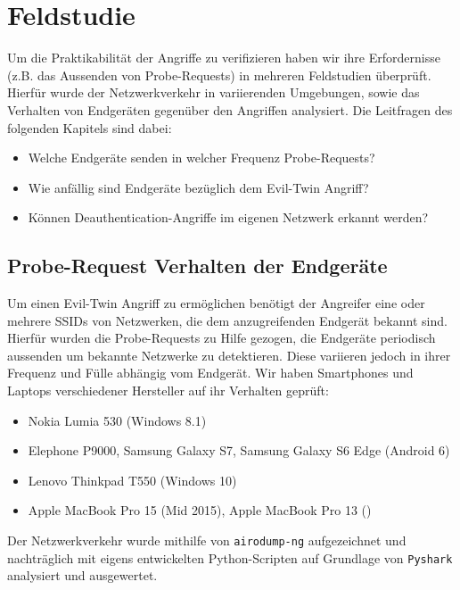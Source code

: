 \section{Feldstudie}
Um die Praktikabilität der Angriffe zu verifizieren haben wir ihre Erfordernisse (z.B. das Aussenden von Probe-Requests) in mehreren Feldstudien überprüft.
Hierfür wurde der Netzwerkverkehr in variierenden Umgebungen, sowie das Verhalten von Endgeräten gegenüber den Angriffen analysiert.
Die Leitfragen des folgenden Kapitels sind dabei:
\begin{itemize}
	\item Welche Endgeräte senden in welcher Frequenz Probe-Requests?
	\item Wie anfällig sind Endgeräte bezüglich dem Evil-Twin Angriff?
	\item Können Deauthentication-Angriffe im eigenen Netzwerk erkannt werden?
\end{itemize}

\subsection{Probe-Request Verhalten der Endgeräte}
Um einen Evil-Twin Angriff zu ermöglichen benötigt der Angreifer eine oder mehrere SSIDs von Netzwerken, die dem anzugreifenden Endgerät bekannt sind.
Hierfür wurden die Probe-Requests zu Hilfe gezogen, die Endgeräte periodisch aussenden um bekannte Netzwerke zu detektieren.
Diese variieren jedoch in ihrer Frequenz und Fülle abhängig vom Endgerät.
Wir haben Smartphones und Laptops verschiedener Hersteller auf ihr Verhalten geprüft:
\begin{itemize}
	\item Nokia Lumia 530 (Windows 8.1)
	\item Elephone P9000, Samsung Galaxy S7, Samsung Galaxy S6 Edge (Android 6)
	\item Lenovo Thinkpad T550 (Windows 10)
	\item Apple MacBook Pro 15 (Mid 2015), Apple MacBook Pro 13 () %
\end{itemize}
Der Netzwerkverkehr wurde mithilfe von \texttt{airodump-ng} aufgezeichnet und nachträglich mit eigens entwickelten Python-Scripten auf Grundlage von \texttt{Pyshark} analysiert und ausgewertet.


